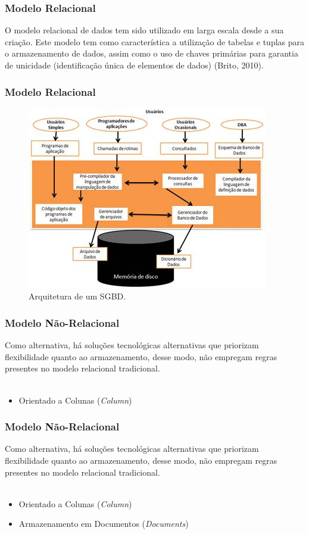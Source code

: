 \documentclass[aspectratio=169]{beamer}
\begin{document}
\begin{frame}
\frametitle{Modelo Relacional}
\justifying

O modelo relacional de dados tem sido utilizado em larga escala desde a sua criação. Este modelo tem como característica a utilização de tabelas e tuplas para o armazenamento de dados, assim como o uso de chaves primárias para garantia de unicidade (identificação única de elementos de dados) (Brito, 2010).

\end{frame}

\begin{frame}
\frametitle{Modelo Relacional}
\justifying
\begin{figure}
\centering
\includegraphics[scale=.6]{images/sgbd.jpg}
\caption{Arquitetura de um SGBD.}
\label{image:sgbd}

\end{figure}


\end{frame}

\begin{frame}
\frametitle{Modelo Não-Relacional}
\justifying
Como alternativa, há soluções tecnológicas alternativas que priorizam flexibilidade quanto ao armazenamento, desse modo, não empregam regras presentes no modelo relacional tradicional.\\~\\
\begin{itemize}
\item Orientado a Colunas (\textit{Column})
\end{itemize}
\end{frame}

\begin{frame}
\frametitle{Modelo Não-Relacional}
\justifying
Como alternativa, há soluções tecnológicas alternativas que priorizam flexibilidade quanto ao armazenamento, desse modo, não empregam regras presentes no modelo relacional tradicional.\\~\\
\begin{itemize}
\item Orientado a Colunas (\textit{Column})
\item Armazenamento em Documentos (\textit{Documents})
\end{itemize}
\end{frame}
\end{document}
